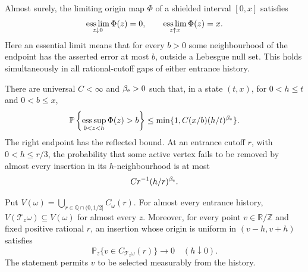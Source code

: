\documentclass[11pt,letterpaper]{article}
\newcommand{\PP}{\mathbb P}\newcommand{\EE}{\mathbb E}
\newcommand{\T}{\mathbb R/\mathbb Z}\newcommand{\Leb}{\operatorname{Leb}}
\begin{document}
\begin{lemma}
\label{lem:origin-endpoint}
Almost surely, the limiting origin map $\Phi$ of a shielded interval
$[0,x]$ satisfies
\begin{equation}\label{eq:origin-endpoint}
 \mathop{\rm ess\,lim}_{z\downarrow0}\Phi(z)=0,
 \qquad
 \mathop{\rm ess\,lim}_{z\uparrow x}\Phi(z)=x.
\end{equation}
Here an essential limit means that for every $b>0$ some neighbourhood
of the endpoint has the asserted error at most $b$, outside a
Lebesgue null set. This holds simultaneously in all rational-cutoff
gaps of either entrance history.

There are universal $C<\infty$ and $\beta_{\rm e}>0$ such that,
in a state $(t,x)$, for $0<h\le t$ and $0<b\le x$,
\begin{equation}\label{eq:endpoint-power}
 \PP\left\{\mathop{\rm ess\,sup}_{0<z<h}\Phi(z)>b\right\}
 \le\min\{1,C(x/b)(h/t)^{\beta_{\rm e}}\}.
\end{equation}
The right endpoint has the reflected bound. At an entrance cutoff
$r$, with $0<h\le r/3$, the probability that some active vertex
fails to be removed by almost every insertion in its $h$-neighbourhood
is at most
\begin{equation}\label{eq:uniform-endpoint-removal}
 C r^{-1}(h/r)^{\beta_{\rm e}}.
\end{equation}

Put $V(\omega)=\bigcup_{r\in\mathbb Q\cap(0,1/2]}C_\omega(r)$.
For almost every entrance history,
$V(\mathcal T_z\omega)\subseteq V(\omega)$ for almost every $z$.
Moreover, for every point $v\in\T$ and fixed positive rational $r$,
an insertion whose origin is uniform in $(v-h,v+h)$ satisfies
\begin{equation}\label{eq:targeted-removal}
 \PP_z\{v\in C_{\mathcal T_z\omega}(r)\}\longrightarrow0
       \quad(h\downarrow0).
\end{equation}
The statement permits $v$ to be selected measurably from the history.
\end{lemma}
\end{document}
